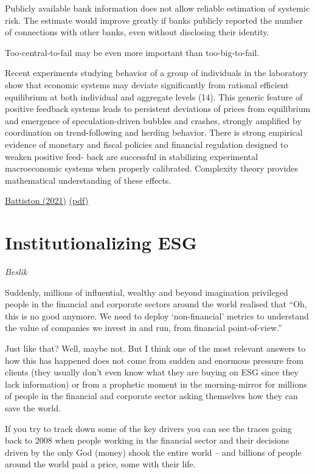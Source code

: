 \documentclass[
]{book}
\begin{document}
Publicly available bank information does not allow reliable estimation of systemic risk. The
estimate would improve greatly if banks
publicly reported the number of connections with other banks, even without
disclosing their identity.

Too-central-to-fail may be even more important than
too-big-to-fail.

Recent experiments studying behavior
of a group of individuals in the laboratory
show that economic systems may deviate
significantly from rational efficient equilibrium at both individual and aggregate
levels (14). This generic feature of positive
feedback systems leads to persistent deviations
of prices from equilibrium and emergence of speculation-driven bubbles and
crashes, strongly amplified by coordination
on trend-following and herding behavior.
There is strong empirical evidence of
monetary and fiscal policies and financial
regulation designed to weaken positive feed-
back are successful in stabilizing experimental
macroeconomic systems when properly
calibrated. Complexity theory provides
mathematical understanding of these effects.

\href{https://www.science.org/doi/10.1126/science.aad0299}{Battiston (2021)}
\href{pdf/Battiston_2021_Complexity_Theory_and_Financial_Regulation.pdf}{(pdf)}

\hypertarget{institutionalizing-esg}{%
\section{Institutionalizing ESG}\label{institutionalizing-esg}}

\emph{Beslik}

Suddenly, millions of influential, wealthy and beyond imagination privileged people in the financial and corporate sectors around the world realised that ``Oh, this is no good anymore. We need to deploy `non-financial' metrics to understand the value of companies we invest in and run, from financial point-of-view.''

Just like that? Well, maybe not. But I think one of the most relevant answers to how this has happened does not come from sudden and enormous pressure from clients (they usually don't even know what they are buying on ESG since they lack information) or from a prophetic moment in the morning-mirror for millions of people in the financial and corporate sector asking themselves how they can save the world.

If you try to track down some of the key drivers you can see the traces going back to 2008 when people working in the financial sector and their decisions driven by the only God (money) shook the entire world -- and billions of people around the world paid a price, some with their life.
\end{document}
